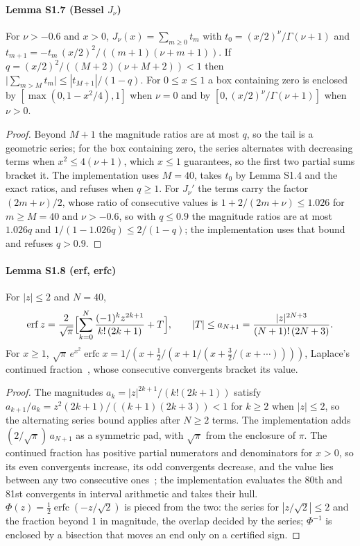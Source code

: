 \documentclass[preprint,11pt,a4paper]{elsarticle}
\theoremstyle{definition}
\begin{document}
\paragraph{Lemma S1.7 (Bessel $J_\nu$)}
For $\nu>-0.6$ and $x>0$, $J_\nu(x)=\sum_{m\ge0}t_m$ with $t_0=(x/2)^{\nu}/\Gamma(\nu+1)$ and $t_{m+1}=-t_m\,(x/2)^2/((m+1)(\nu+m+1))$. If $q=(x/2)^2/((M+2)(\nu+M+2))<1$ then $\bigl|\sum_{m>M}t_m\bigr|\le|t_{M+1}|/(1-q)$. For $0\le x\le1$ a box containing zero is enclosed by $[\max(0,1-x^2/4),1]$ when $\nu=0$ and by $[0,(x/2)^{\nu}/\Gamma(\nu+1)]$ when $\nu>0$.

\begin{proof}
Beyond $M+1$ the magnitude ratios are at most $q$, so the tail is a geometric series; for the box containing zero, the series alternates with decreasing terms when $x^2\le4(\nu+1)$, which $x\le1$ guarantees, so the first two partial sums bracket it. The implementation uses $M=40$, takes $t_0$ by Lemma S1.4 and the exact ratios, and refuses when $q\ge1$. For $J_\nu'$ the terms carry the factor $(2m+\nu)/2$, whose ratio of consecutive values is $1+2/(2m+\nu)\le1.026$ for $m\ge M=40$ and $\nu>-0.6$, so with $q\le0.9$ the magnitude ratios are at most $1.026q$ and $1/(1-1.026q)\le2/(1-q)$; the implementation uses that bound and refuses $q>0.9$.
\end{proof}

\paragraph{Lemma S1.8 (erf, erfc)}
For $|z|\le2$ and $N=40$,
\[
\operatorname{erf}z=\frac{2}{\sqrt\pi}\Bigl[\sum_{k=0}^{N}\frac{(-1)^k z^{2k+1}}{k!\,(2k+1)}+T\Bigr],\qquad |T|\le a_{N+1}=\frac{|z|^{2N+3}}{(N+1)!\,(2N+3)}.
\]
For $x\ge1$, $\sqrt\pi\,e^{x^2}\operatorname{erfc}x=1/(x+\tfrac12/(x+1/(x+\tfrac32/(x+\cdots))))$, Laplace's continued fraction~\citep[7.9.2]{DLMF}, whose consecutive convergents bracket its value.

\begin{proof}
The magnitudes $a_k=|z|^{2k+1}/(k!(2k+1))$ satisfy $a_{k+1}/a_k=z^2(2k+1)/((k+1)(2k+3))<1$ for $k\ge2$ when $|z|\le2$, so the alternating series bound applies after $N\ge2$ terms. The implementation adds $(2/\sqrt\pi)\,a_{N+1}$ as a symmetric pad, with $\sqrt\pi$ from the enclosure of $\pi$. The continued fraction has positive partial numerators and denominators for $x>0$, so its even convergents increase, its odd convergents decrease, and the value lies between any two consecutive ones~\citep[Thm.~1.5.1 and \S13.2]{Cuyt08}; the implementation evaluates the 80th and 81st convergents in interval arithmetic and takes their hull. $\Phi(z)=\tfrac12\operatorname{erfc}(-z/\sqrt2)$ is pieced from the two: the series for $|z/\sqrt2|\le2$ and the fraction beyond $1$ in magnitude, the overlap decided by the series; $\Phi^{-1}$ is enclosed by a bisection that moves an end only on a certified sign.
\end{proof}
\end{document}
